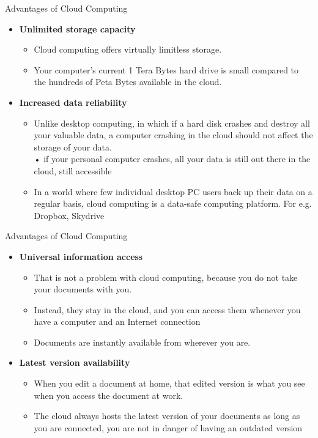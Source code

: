 \documentclass{SKP-beamer}
\begin{document}
\begin{frame}{Advantages of Cloud Computing}
	\begin{itemize}
		
		\item  \textbf{Unlimited storage capacity}
		\begin{itemize}
		\item  Cloud computing offers virtually limitless storage.
		\item  Your computer's current 1 Tera Bytes hard drive is small compared to the hundreds of Peta 
		Bytes available in the cloud.
			
		\end{itemize}
		\item  \textbf{Increased data reliability}
		\begin{itemize}
		\item  Unlike desktop computing, in which if a hard disk crashes and destroy all your 
		valuable data, a computer crashing in the cloud should not affect the storage of your 
		data. \\
		• if your personal computer crashes, all your data is still out there in the cloud, still accessible
		\item  In a world where few individual desktop PC users back up their data on a regular basis, 
		cloud computing is a data-safe computing platform. For e.g. Dropbox, Skydrive
		
		\end{itemize}
	\end{itemize}
\end{frame}

\begin{frame}{Advantages of Cloud Computing}
	\begin{itemize}
		
		\item  \textbf{Universal information access}
		\begin{itemize}
			\item  That is not a problem with cloud computing, because you do not take your
			documents with you.
			\item  Instead, they stay in the cloud, and you can access them whenever you have a 
			computer and an Internet connection
			\item  Documents are instantly available from wherever you are.
			
		\end{itemize}
		\item  \textbf{Latest version availability}
		\begin{itemize}
			\item  When you edit a document at home, that edited version is what you see when
			you access the document at work.
			\item  The cloud always hosts the latest version of your documents as long as you are 
			connected, you are not in danger of having an outdated version
			
		\end{itemize}
	\end{itemize}
\end{frame}
\end{document}
